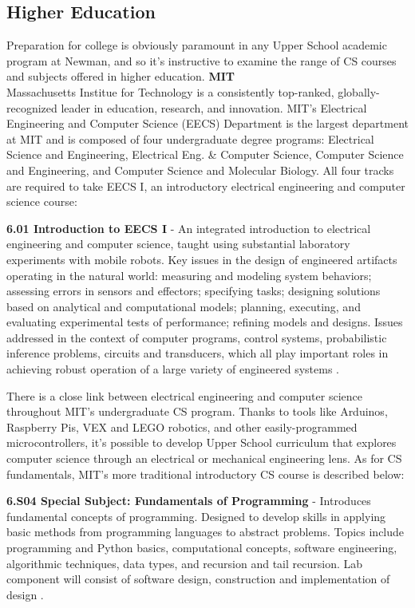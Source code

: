 \subsection{Higher Education}
Preparation for college is obviously paramount in any Upper School academic program at Newman, and so it's instructive to examine the range of CS courses and subjects offered in higher education. 
\textbf{MIT} \\
Massachusetts Institue for Technology is a consistently top-ranked, globally-recognized leader in education, research, and innovation. MIT's Electrical Engineering and Computer Science (EECS) Department is the largest department at MIT and is composed of four undergraduate degree programs: Electrical Science and Engineering, Electrical Eng. \& Computer Science, Computer Science and Engineering, and Computer Science and Molecular Biology. All four tracks are required to take EECS I, an introductory electrical engineering and computer science course:
\begin{blockquote}
\textbf{6.01 Introduction to EECS I} - An integrated introduction to electrical engineering and computer science, taught using substantial laboratory experiments with mobile robots. Key issues in the design of engineered artifacts operating in the natural world: measuring and modeling system behaviors; assessing errors in sensors and effectors; specifying tasks; designing solutions based on analytical and computational models; planning, executing, and evaluating experimental tests of performance; refining models and designs. Issues addressed in the context of computer programs, control systems, probabilistic inference problems, circuits and transducers, which all play important roles in achieving robust operation of a large variety of engineered systems \cite{mit}.
\end{blockquote}
There is a close link between electrical engineering and computer science throughout MIT's undergraduate CS program. Thanks to tools like Arduinos, Raspberry Pis, VEX and LEGO robotics, and other easily-programmed microcontrollers, it's possible to develop Upper School curriculum that explores computer science through an electrical or mechanical engineering lens. As for CS fundamentals, MIT's more traditional introductory CS course is described below:
\begin{blockquote}
	\textbf{6.S04 Special Subject: Fundamentals of Programming} - Introduces fundamental concepts of programming. Designed to develop skills in applying basic methods from programming languages to abstract problems. Topics include programming and Python basics, computational concepts, software engineering, algorithmic techniques, data types, and recursion and tail recursion. Lab component will consist of software design, construction and implementation of design \cite{mit}. 
	\end{blockquote} \par
